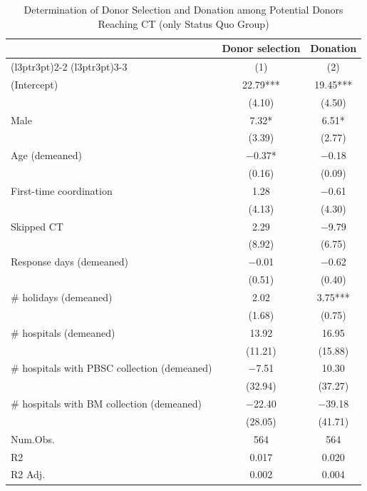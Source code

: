 \documentclass[12pt, a4paper]{article}
\begin{document}
\begin{table}[H]
\centering\centering
\caption{\label{tab:lm-who-selected-statusquo}Determination of Donor Selection and Donation among Potential Donors Reaching CT (only Status Quo Group)}
\centering
\fontsize{8}{10}\selectfont
\begin{threeparttable}
\begin{tabular}[t]{lcc}
\toprule
\multicolumn{1}{c}{ } & \multicolumn{1}{c}{Donor selection} & \multicolumn{1}{c}{Donation} \\
\cmidrule(l{3pt}r{3pt}){2-2} \cmidrule(l{3pt}r{3pt}){3-3}
  & (1) & (2)\\
\midrule
(Intercept) & \num{22.79}*** & \num{19.45}***\\
 & (\num{4.10}) & (\num{4.50})\\
Male & \num{7.32}* & \num{6.51}*\\
 & (\num{3.39}) & (\num{2.77})\\
Age (demeaned) & \num{-0.37}* & \num{-0.18}\\
 & (\num{0.16}) & (\num{0.09})\\
First-time coordination & \num{1.28} & \num{-0.61}\\
 & (\num{4.13}) & (\num{4.30})\\
Skipped CT & \num{2.29} & \num{-9.79}\\
 & (\num{8.92}) & (\num{6.75})\\
Response days (demeaned) & \num{-0.01} & \num{-0.62}\\
 & (\num{0.51}) & (\num{0.40})\\
\# holidays (demeaned) & \num{2.02} & \num{3.75}***\\
 & (\num{1.68}) & (\num{0.75})\\
\# hospitals (demeaned) & \num{13.92} & \num{16.95}\\
 & (\num{11.21}) & (\num{15.88})\\
\# hospitals with PBSC collection (demeaned) & \num{-7.51} & \num{10.30}\\
 & (\num{32.94}) & (\num{37.27})\\
\# hospitals with BM collection (demeaned) & \num{-22.40} & \num{-39.18}\\
 & (\num{28.05}) & (\num{41.71})\\
\midrule
Num.Obs. & \num{564} & \num{564}\\
R2 & \num{0.017} & \num{0.020}\\
R2 Adj. & \num{0.002} & \num{0.004}\\
\bottomrule
\end{tabular}

\end{threeparttable}
\end{table}
\end{document}
